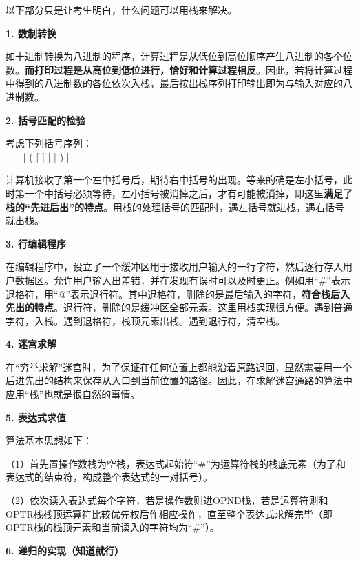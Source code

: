 以下部分只是让考生明白，什么问题可以用栈来解决。

\textbf{{1. 数制转换}}

如十进制转换为八进制的程序，计算过程是从低位到高位顺序产生八进制的各个位数。\textbf{{而打印过程是从高位到低位进行，恰好和计算过程相反}}。因此，若将计算过程中得到的八进制数的各位依次入栈，最后按出栈序列打印输出即为与输入对应的八进制数。

\textbf{{2. 括号匹配的检验}}

考虑下列括号序列：\\
\hspace*{0.333em} ~ ~~{[} ( {[} {]} {[} {]} ) {]}

计算机接收了第一个左中括号后，期待右中括号的出现。等来的确是左小括号，此时第一个中括号必须等待，左小括号被消掉之后，才有可能被消掉，即这里\textbf{{满足了栈的``先进后出''的特点}}。用栈的处理括号的匹配时，遇左括号就进栈，遇右括号就出栈。

\textbf{{3. 行编辑程序}}

在编辑程序中，设立了一个缓冲区用于接收用户输入的一行字符，然后逐行存入用户数据区。允许用户输入出差错，并在发现有误时可以及时更正。例如用``\#''表示退格符，用``@''表示退行符。其中退格符，删除的是最后输入的字符，\textbf{{符合栈后入先出的特点}}。退行符，删除的是缓冲区全部元素。这里用栈实现很方便。{遇到普通字符，入栈。遇到退格符，栈顶元素出栈。遇到退行符，清空栈。}

\textbf{{4. 迷宫求解}}

在``穷举求解''迷宫时，为了保证在任何位置上都能沿着原路退回，显然需要用一个后进先出的结构来保存从入口到当前位置的路径。因此，在求解迷宫通路的算法中应用``栈''也就是很自然的事情。

\textbf{{5. 表达式求值}}

算法基本思想如下：

（1）首先置操作数栈为空栈，表达式起始符``\#''为运算符栈的栈底元素（为了和表达式的结束符，构成整个表达式的一对括号）。

（2）依次读入表达式每个字符，若是操作数则进OPND栈，若是运算符则和OPTR栈栈顶运算符比较优先权后作相应操作，直至整个表达式求解完毕（即OPTR栈的栈顶元素和当前读入的字符均为``\#''）。

\textbf{{6. 递归的实现（知道就行）}}
